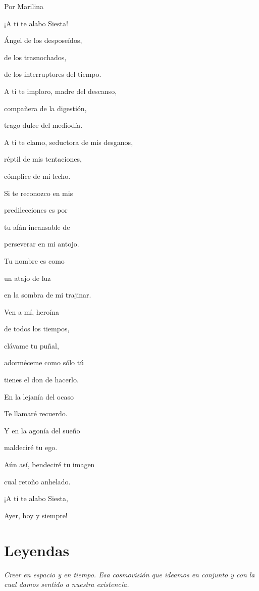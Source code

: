 \documentclass[11pt,twoside,openright,a5paper]{book}
\begin{document}
                                                                                                  \begin{flushright}Por Marilina\end{flushright}
\begin{center}
¡A ti te alabo Siesta!

Ángel de los desposeídos,

de los trasnochados, 

de los interruptores del tiempo.

A ti te imploro, madre del descanso, 

compañera de la digestión,

trago dulce del mediodía. 

A ti te clamo, seductora de mis desganos, 

réptil de mis tentaciones, 

cómplice de mi lecho.

Si te reconozco en mis 

predilecciones es por 

tu afán incansable de 

perseverar en mi antojo.

Tu nombre es como

un atajo de luz

en la sombra de mi trajinar.

Ven a mí, heroína

de todos los tiempos, 

clávame tu puñal, 

adorméceme como sólo tú

tienes el don de hacerlo.

En la lejanía del ocaso

Te llamaré recuerdo.

Y en la agonía del sueño

maldeciré  tu ego.

Aún así, bendeciré tu imagen

cual retoño anhelado.

¡A ti te alabo Siesta,

Ayer, hoy y siempre!
\end{center}

\chapter*{Leyendas}

\vspace{0.5cm}
\emph{Creer en espacio y en tiempo. Esa cosmovisión que ideamos en conjunto y con la cual damos sentido a nuestra existencia.}
\end{document}

